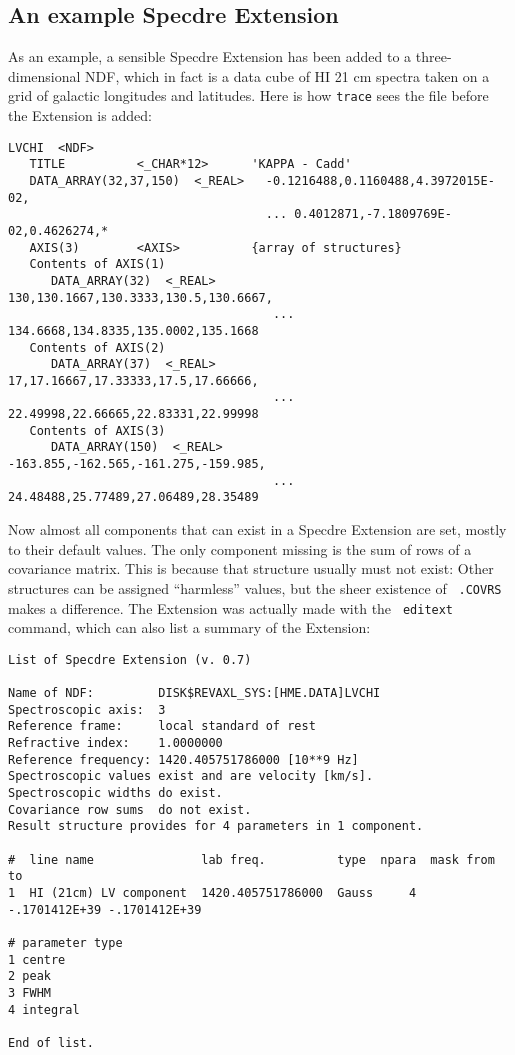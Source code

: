 \goodbreak
\subsection{An example Specdre Extension}

As an example, a sensible Specdre Extension has been added to a
three-dimensional NDF, which in fact is a data cube of HI 21 cm spectra taken
on a grid of galactic longitudes and latitudes. Here is how {\tt trace} sees
the file before the Extension is added:
\small
\begin{verbatim}
LVCHI  <NDF>
   TITLE          <_CHAR*12>      'KAPPA - Cadd'
   DATA_ARRAY(32,37,150)  <_REAL>   -0.1216488,0.1160488,4.3972015E-02,
                                    ... 0.4012871,-7.1809769E-02,0.4626274,*
   AXIS(3)        <AXIS>          {array of structures}
   Contents of AXIS(1)
      DATA_ARRAY(32)  <_REAL>        130,130.1667,130.3333,130.5,130.6667,
                                     ... 134.6668,134.8335,135.0002,135.1668
   Contents of AXIS(2)
      DATA_ARRAY(37)  <_REAL>        17,17.16667,17.33333,17.5,17.66666,
                                     ... 22.49998,22.66665,22.83331,22.99998
   Contents of AXIS(3)
      DATA_ARRAY(150)  <_REAL>       -163.855,-162.565,-161.275,-159.985,
                                     ... 24.48488,25.77489,27.06489,28.35489
\end{verbatim}
\normalsize
\goodbreak
Now almost all components that can exist in a Specdre Extension are set, mostly
to their default values. The only component missing is the sum of rows of a
covariance matrix. This is because that structure usually must not exist: Other
structures can be assigned ``harmless'' values, but the sheer existence of {\tt
.COVRS} makes a difference. The Extension was actually made with the {\tt
editext} command, which can also list a summary of the Extension:
\goodbreak
\small
\begin{verbatim}
List of Specdre Extension (v. 0.7)

Name of NDF:         DISK$REVAXL_SYS:[HME.DATA]LVCHI
Spectroscopic axis:  3
Reference frame:     local standard of rest
Refractive index:    1.0000000
Reference frequency: 1420.405751786000 [10**9 Hz]
Spectroscopic values exist and are velocity [km/s].
Spectroscopic widths do exist.
Covariance row sums  do not exist.
Result structure provides for 4 parameters in 1 component.

#  line name               lab freq.          type  npara  mask from     to
1  HI (21cm) LV component  1420.405751786000  Gauss     4  -.1701412E+39 -.1701412E+39

# parameter type
1 centre
2 peak
3 FWHM
4 integral

End of list.
\end{verbatim}
